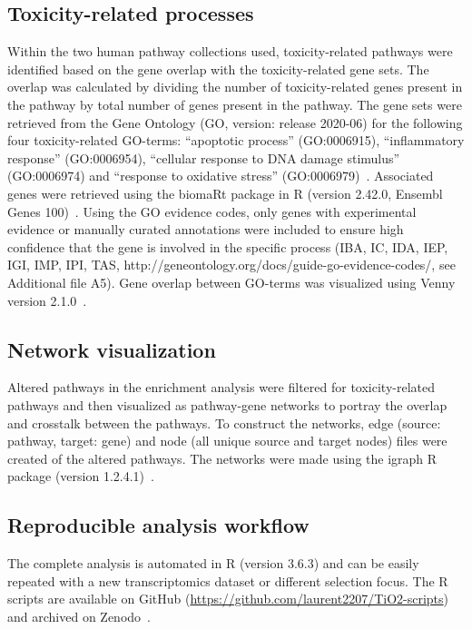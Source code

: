 \documentclass[ijms,article,submit,moreauthors,pdftex]{Definitions/mdpi}
\begin{document}
\subsection*{Toxicity-related processes}
Within the two human pathway collections used, toxicity-related pathways were identified based on the gene overlap with the toxicity-related gene sets. The overlap was calculated by dividing the number of toxicity-related genes present in the pathway by total number of genes present in the pathway. The gene sets were retrieved from the Gene Ontology (GO, version: release 2020-06) for the following four toxicity-related GO-terms: “apoptotic process” (GO:0006915), “inflammatory response” (GO:0006954), “cellular response to DNA damage stimulus” (GO:0006974) and “response to oxidative stress” (GO:0006979)~\cite{Ashburner2000,Carbon2020}. Associated genes were retrieved using the biomaRt package in R (version 2.42.0, Ensembl Genes 100)~\cite{Durinck2005,Durinck2009}. Using the GO evidence codes, only genes with experimental evidence or manually curated annotations were included to ensure high confidence that the gene is involved in the specific process (IBA, IC, IDA, IEP, IGI, IMP, IPI, TAS, http://geneontology.org/docs/guide-go-evidence-codes/, see Additional file A5). Gene overlap between GO-terms was visualized using Venny version 2.1.0~\cite{Venny}. 

\subsection*{Network visualization}
Altered pathways in the enrichment analysis were filtered for toxicity-related pathways and then visualized as pathway-gene networks to portray the overlap and crosstalk between the pathways. To construct the networks, edge (source: pathway, target: gene) and node (all unique source and target nodes) files were created of the altered pathways. The networks were made using the igraph R package (version 1.2.4.1)~\cite{Csardi2006}.

\subsection*{Reproducible analysis workflow}
The complete analysis is automated in R (version 3.6.3) and can be easily repeated with a new transcriptomics dataset or different selection focus. The R scripts are available on GitHub (\url{https://github.com/laurent2207/TiO2-scripts}) and archived on Zenodo~\cite{TiO2-scripts}.
\end{document}
